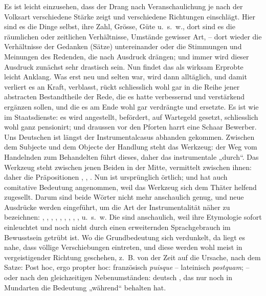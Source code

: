 {Es ist leicht einzusehen, dass der Drang nach Veranschaulichung je nach der Volksart verschiedene Stärke zeigt und verschiedene Richtungen einschlägt. \label{sp.241} Hier sind es die Dinge selbst, ihre Zahl, Grösse, Güte u.~s.~w., dort sind es die räumlichen oder zeitlichen Verhältnisse, Umstände gewisser Art, – dort wieder die Verhältnisse der Gedanken (Sätze) untereinander oder die Stimmungen und Meinungen des Redenden, die nach Ausdruck drängen; und immer wird dieser Ausdruck zunächst sehr drastisch sein. Nun findet das als wirksam Erprobte leicht Anklang. Was erst neu und selten war, wird dann alltäglich, und damit verliert es an Kraft, verblasst, rückt schliesslich wohl gar in die Reihe jener abstracten Bestandtheile der Rede, die es hatte verbessernd und verstärkend ergänzen sollen, und die es am Ende wohl gar verdrängte und ersetzte. Es ist wie im Staatsdienste: es wird angestellt, befördert, auf Wartegeld gesetzt, schliesslich wohl ganz pensionirt; und draussen vor den Pforten harrt eine Schaar Bewerber. Uns Deutschen ist längst der Instrumentalcasus abhanden gekommen. Zwischen dem Subjecte und dem Objecte der Handlung steht das Werkzeug: der Weg vom Handelnden zum Behandelten führt  dieses, daher das instrumentale „durch“. Das Werkzeug steht zwischen jenen Beiden in der Mitte, vermittelt zwischen ihnen: daher die Präpositionen , , . Nun ist  ursprünglich örtlich; und  hat auch comitative Bedeutung angenommen, weil das Werkzeug sich dem Thäter helfend zugesellt. Darum sind beide Wörter nicht mehr anschaulich genug, und neue Ausdrücke werden eingeführt, um die Art der Instrumentalität näher zu bezeichnen: , , , , , , , , ,  u.~s.~w. Die sind anschaulich, weil ihre Etymologie sofort einleuchtet und noch nicht durch einen erweiternden Sprachgebrauch im Bewusstsein getrübt ist. Wo die Grundbedeutung sich verdunkelt, da liegt es nahe, dass völlige Verschiebungen eintreten, und diese werden wohl meist in vergeistigender Richtung geschehen, z.~B. von der Zeit auf die Ursache, nach dem Satze: \label{fp.239} Post hoc, ergo propter hoc: französisch \textit{puisque} – lateinisch \textit{postquam}; – oder nach den gleichzeitigen Nebenumständen: deutsch , das nur noch in Mundarten die Bedeutung „während“ behalten hat.

}
